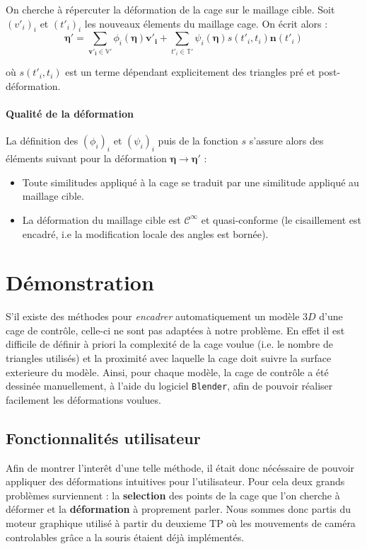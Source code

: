 \documentclass[10pt,a4paper]{article}
\begin{document}
On cherche à répercuter la déformation de la cage sur le maillage cible. Soit $\left( v'_i \right)_i$ et $\left( t'_i \right)_i$ les nouveaux élements du maillage cage. On écrit alors :
\begin{equation}
\label{eq:def}
\mathbf{\eta'} = \sum_{\mathbf{v'_i} \in \mathbb{V}'} \phi_i \left( \mathbf{\eta} \right) \mathbf{v'_i} 
+ \sum_{t'_i \in \mathbb{T}'} \psi_i \left( \mathbf{\eta} \right) s \left(t'_i, t_i \right) \mathbf{n} \left( t'_i \right)
\end{equation}

où $s \left(t'_i, t_i \right)$ est un terme dépendant explicitement des triangles pré et post-déformation.

\paragraph{Qualité de la déformation}La définition des $\left( \phi_i \right)_i$ et $\left( \psi_i \right)_i$ puis de la fonction $s$ s'assure alors des éléments suivant pour la déformation $\boldsymbol\eta \rightarrow \boldsymbol\eta'$ :
\begin{itemize}
\item Toute similitudes appliqué à la cage se traduit par une similitude appliqué au maillage cible.
\item La déformation du maillage cible est $\mathcal{C}^\infty$ et quasi-conforme (le cisaillement est encadré, i.e la modification locale des angles est bornée).
\end{itemize}

\section{Démonstration}
S'il existe des méthodes pour \textit{encadrer} automatiquement un modèle $3D$ d'une cage de contrôle, celle-ci ne sont pas adaptées à notre problème. En effet il est difficile de définir à  priori la complexité de la cage voulue (i.e. le nombre de triangles utilisés) et la proximité avec laquelle la cage doit suivre la surface exterieure du modèle. Ainsi, pour chaque modèle, la cage de contrôle a été dessinée manuellement, à l'aide du logiciel \texttt{Blender}, afin de pouvoir réaliser facilement les déformations voulues.
 
\subsection{Fonctionnalités utilisateur}
Afin de montrer l'interêt d'une telle méthode, il était donc nécéssaire de pouvoir appliquer des déformations intuitives pour l'utilisateur. Pour cela deux grands problèmes surviennent : la \textbf{selection} des points de la cage que l'on cherche à déformer et la \textbf{déformation} à proprement parler. Nous sommes donc partis du moteur graphique utilisé à partir du deuxieme TP où les mouvements de caméra controlables grâce a la souris étaient déjà implémentés.
\end{document}
